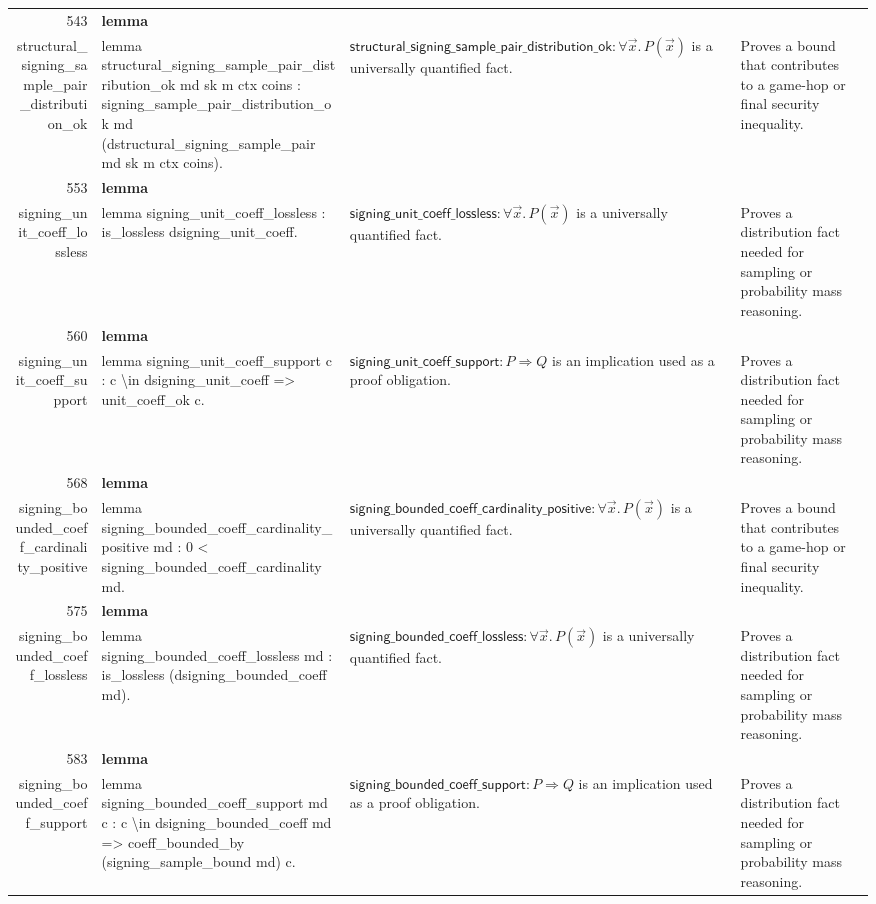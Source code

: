 \documentclass[10pt]{article}
\newcommand{\ec}[1]{\begingroup\ttfamily\scriptsize #1\endgroup}
\begin{document}
\begin{longtable}{r L{0.17\textwidth} L{0.26\textwidth} L{0.27\textwidth} L{0.20\textwidth}}
543 & \textbf{lemma}\\\ec{structural\_signing\_sample\_pair\_distribution\_ok} & \ec{lemma structural\_signing\_sample\_pair\_distribution\_ok md sk m ctx coins : signing\_sample\_pair\_distribution\_ok md (dstructural\_signing\_sample\_pair md sk m ctx coins).} & \(\mathsf{structural\_signing\_sample\_pair\_distribution\_ok} : \forall \vec{x}.\, P(\vec{x})\) is a universally quantified fact. & Proves a bound that contributes to a game-hop or final security inequality. \\
553 & \textbf{lemma}\\\ec{signing\_unit\_coeff\_lossless} & \ec{lemma signing\_unit\_coeff\_lossless : is\_lossless dsigning\_unit\_coeff.} & \(\mathsf{signing\_unit\_coeff\_lossless} : \forall \vec{x}.\, P(\vec{x})\) is a universally quantified fact. & Proves a distribution fact needed for sampling or probability mass reasoning. \\
560 & \textbf{lemma}\\\ec{signing\_unit\_coeff\_support} & \ec{lemma signing\_unit\_coeff\_support c : c \textbackslash{}in dsigning\_unit\_coeff => unit\_coeff\_ok c.} & \(\mathsf{signing\_unit\_coeff\_support} : P \Rightarrow Q\) is an implication used as a proof obligation. & Proves a distribution fact needed for sampling or probability mass reasoning. \\
568 & \textbf{lemma}\\\ec{signing\_bounded\_coeff\_cardinality\_positive} & \ec{lemma signing\_bounded\_coeff\_cardinality\_positive md : 0 < signing\_bounded\_coeff\_cardinality md.} & \(\mathsf{signing\_bounded\_coeff\_cardinality\_positive} : \forall \vec{x}.\, P(\vec{x})\) is a universally quantified fact. & Proves a bound that contributes to a game-hop or final security inequality. \\
575 & \textbf{lemma}\\\ec{signing\_bounded\_coeff\_lossless} & \ec{lemma signing\_bounded\_coeff\_lossless md : is\_lossless (dsigning\_bounded\_coeff md).} & \(\mathsf{signing\_bounded\_coeff\_lossless} : \forall \vec{x}.\, P(\vec{x})\) is a universally quantified fact. & Proves a distribution fact needed for sampling or probability mass reasoning. \\
583 & \textbf{lemma}\\\ec{signing\_bounded\_coeff\_support} & \ec{lemma signing\_bounded\_coeff\_support md c : c \textbackslash{}in dsigning\_bounded\_coeff md => coeff\_bounded\_by (signing\_sample\_bound md) c.} & \(\mathsf{signing\_bounded\_coeff\_support} : P \Rightarrow Q\) is an implication used as a proof obligation. & Proves a distribution fact needed for sampling or probability mass reasoning. \\

\end{longtable}
\end{document}
